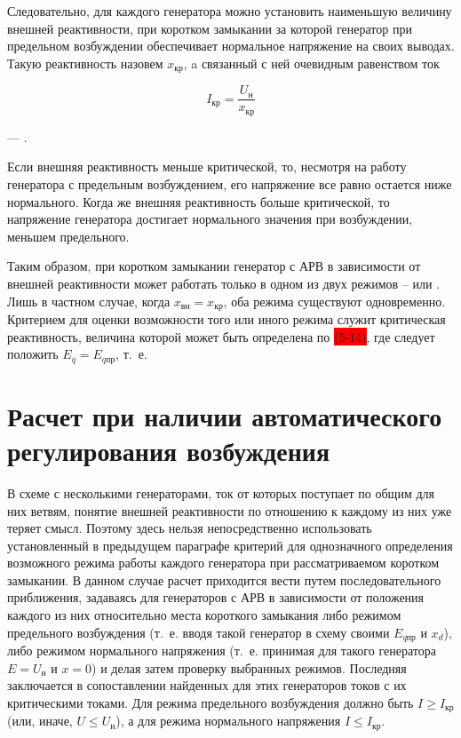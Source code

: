 Следовательно, для каждого генератора можно установить наименьшую величину внешней реактивности, при коротком замыкании за которой генератор при предельном возбуждении обеспечивает нормальное напряжение на своих выводах. Такую реактивность назовем  $ x_{\text{кр}} $, a связанный с ней очевидным равенством ток

\begin{equation}
    \label{eq:5-16 I_kr}
    I_{\text{кр}}=\frac{U_{\text{н}}}{x_{\text{кр}}}
\end{equation}

--- .

Если внешняя реактивность меньше критической, то, несмотря на работу генератора с предельным возбуждением, его напряжение все равно остается ниже нормального. Когда же внешняя реактивность больше критической, то напряжение генератора достигает нормального значения при возбуждении, меньшем предельного.

Таким образом, при коротком замыкании генератор с АРВ в зависимости от внешней реактивности может работать только в одном из двух режимов --  или . Лишь в частном случае, когда $ x_{\text{вн}} = x_{\text{кр}} $, оба режима существуют одновременно. Критерием для оценки возможности того или иного режима служит критическая реактивность, величина которой может быть определена по \colorbox{red}{(5-14)}, где следует положить $ E_q = E_{q\text{пр}} $, т.~е.


\section{Расчет при наличии автоматического регулирования возбуждения}
\label{sec:5-7}

В схеме с несколькими генераторами, ток от которых поступает по общим для них ветвям, понятие внешней реактивности по отношению к каждому из них уже теряет смысл. Поэтому здесь нельзя непосредственно использовать установленный в предыдущем параграфе критерий для однозначного определения возможного режима работы каждого генератора при рассматриваемом коротком замыкании. В данном случае расчет приходится вести путем последовательного приближения, задаваясь для генераторов с АРВ в зависимости от положения каждого из них относительно места короткого замыкания либо режимом предельного возбуждения (т.~е. вводя такой генератор в схему своими $ E_{q\text{пр}} $ и $ x_d $), либо режимом нормального напряжения (т.~е. принимая для такого генератора $ E=U_{\text{н}} $ и $ x=0 $) и делая затем проверку выбранных режимов. Последняя заключается в сопоставлении найденных для этих генераторов токов с их критическими токами. Для режима предельного возбуждения должно быть $ I \geqslant I_{\text{кр}} $  (или, иначе, $ U \leqslant U_{\text{н}} $), а для режима нормального напряжения $ I \leqslant I_{\text{кр}} $.

